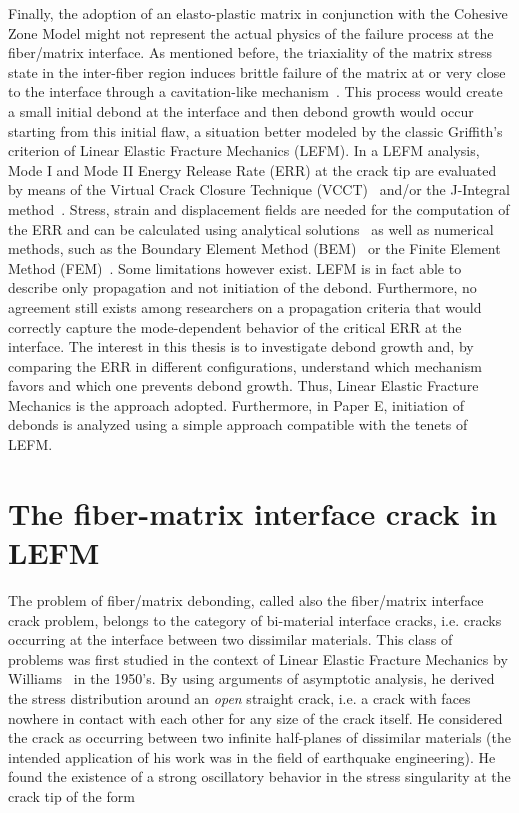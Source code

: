 Finally, the adoption of an elasto-plastic matrix in conjunction with the Cohesive Zone Model might not represent the actual physics of the failure process at the fiber/matrix interface. As mentioned before, the triaxiality of the matrix stress state in the inter-fiber region induces brittle failure of the matrix at or very close to the interface through a cavitation-like mechanism~\cite{Asp1995,Asp1996,Pawlak2014}. This process would create a small initial debond at the interface and then debond growth would occur starting from this initial flaw, a situation better modeled by the classic Griffith's criterion of Linear Elastic Fracture Mechanics (LEFM). In a LEFM analysis, Mode I and Mode II Energy Release Rate (ERR) at the crack tip are evaluated by means of the Virtual Crack Closure Technique (VCCT)~\cite{Krueger2004} and/or the J-Integral method~\cite{Rice1968}. Stress, strain and displacement fields are needed for the computation of the ERR and can be calculated using analytical solutions~\cite{Toya1974} as well as numerical methods, such as the Boundary Element Method (BEM)~\cite{Paris1996} or the Finite Element Method (FEM)~\cite{Zhuang2018}. Some limitations however exist. LEFM is in fact able to describe only propagation and not initiation of the debond. Furthermore, no agreement still exists among researchers on a propagation criteria that would correctly capture the mode-dependent behavior of the critical ERR at the interface. The interest in this thesis is to investigate debond growth and, by comparing the ERR in different configurations, understand which mechanism favors and which one prevents debond growth. Thus, Linear Elastic Fracture Mechanics is the approach adopted. Furthermore, in Paper E, initiation of debonds is analyzed using a simple approach compatible with the tenets of LEFM.

\section{The fiber-matrix interface crack in LEFM}

The problem of fiber/matrix debonding, called also the fiber/matrix interface crack problem, belongs to the category of bi-material interface cracks, i.e. cracks occurring at the interface between two dissimilar materials. This class of problems was first studied in the context of Linear Elastic Fracture Mechanics by Williams~\cite{Williams1959} in the 1950's. By using arguments of asymptotic analysis, he derived the stress distribution around an \emph{open} straight crack, i.e. a crack with faces nowhere in contact with each other for any size of the crack itself. He considered the crack as occurring between two infinite half-planes of dissimilar materials (the intended application of his work was in the field of earthquake engineering). He found the existence of a strong oscillatory behavior in the stress singularity at the crack tip of the form

